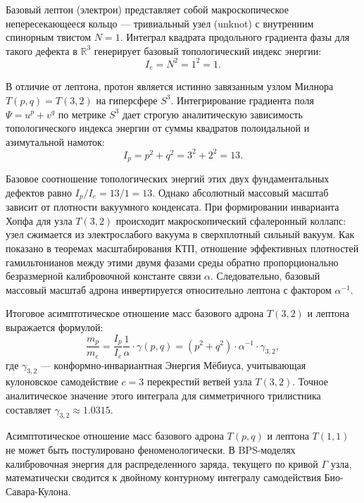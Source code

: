 \documentclass[11pt,a4paper]{article}
\begin{document}
	Базовый лептон (электрон) представляет собой макроскопическое непересекающееся кольцо — тривиальный узел (unknot) с внутренним спинорным твистом $N=1$. Интеграл квадрата продольного градиента фазы для такого дефекта в $\mathbb{R}^3$ генерирует базовый топологический индекс энергии:
	\begin{equation}
		I_e = N^2 = 1^2 = 1.
	\end{equation}
	
	В отличие от лептона, протон является истинно завязанным узлом Милнора $T(p,q) = T(3,2)$ на гиперсфере $S^3$. Интегрирование градиента поля $\Psi = u^p + v^q$ по метрике $S^3$ дает строгую аналитическую зависимость топологического индекса энергии от суммы квадратов полоидальной и азимутальной намоток:
	\begin{equation}
		I_p = p^2 + q^2 = 3^2 + 2^2 = 13.
	\end{equation}
	
	Базовое соотношение топологических энергий этих двух фундаментальных дефектов  равно $I_p / I_e = 13 / 1 = 13$. 
	Однако абсолютный массовый масштаб зависит от плотности вакуумного конденсата. При формировании инварианта Хопфа для узла $T(3,2)$ происходит макроскопический сфалеронный коллапс: узел сжимается из электрослабого вакуума в сверхплотный сильный вакуум. Как показано в теоремах масштабирования КТП, отношение эффективных плотностей гамильтонианов между этими двумя фазами среды обратно пропорционально безразмерной калибровочной константе связи $\alpha$. Следовательно, базовый массовый масштаб адрона инвертируется относительно лептона с фактором $\alpha^{-1}$.
	
	Итоговое асимптотическое отношение масс базового адрона $T(3,2)$ и лептона выражается формулой:
	\begin{equation}
		\frac{m_p}{m_e} = \frac{I_p}{I_e} \frac{1}{\alpha} \cdot \gamma(p,q) = (p^2 + q^2) \cdot \alpha^{-1} \cdot \gamma_{3,2},
		\label{eq:mass_ratio_proton}
	\end{equation}
	где $\gamma_{3,2}$ — конформно-инвариантная Энергия Мёбиуса, учитывающая кулоновское самодействие $c = 3$ перекрестий ветвей узла $T(3,2)$. Точное аналитическое значение этого интеграла для симметричного трилистника составляет $\gamma_{3,2} \approx 1.0315$.
	
	Асимптотическое отношение масс базового адрона $T(p,q)$ и лептона $T(1,1)$ не может быть постулировано феноменологически. В BPS-моделях калибровочная энергия для распределенного заряда, текущего по кривой $\Gamma$ узла, математически сводится к двойному контурному интегралу самодействия Био-Савара-Кулона.
	
\end{document}
